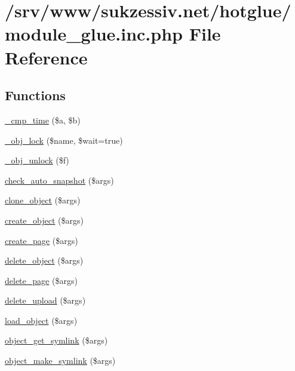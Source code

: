 \hypertarget{module__glue_8inc_8php}{
\section{/srv/www/sukzessiv.net/hotglue/module\_\-glue.inc.php File Reference}
\label{module__glue_8inc_8php}
}
\subsection*{Functions}
\begin{DoxyCompactItemize}
\item 
\hyperlink{module__glue_8inc_8php_a5fea6c120a24a298149febcbf3b1df10}{\_\-cmp\_\-time} (\$a, \$b)
\item 
\hyperlink{module__glue_8inc_8php_a21f260355b875069ca90edf1f9a559d0}{\_\-obj\_\-lock} (\$name, \$wait=true)
\item 
\hyperlink{module__glue_8inc_8php_a73a91facde5362e20df9657d31c2bb06}{\_\-obj\_\-unlock} (\$f)
\item 
\hyperlink{module__glue_8inc_8php_aaa1103a091b9dbca790e77d25a452ca5}{check\_\-auto\_\-snapshot} (\$args)
\item 
\hyperlink{module__glue_8inc_8php_a9c7f39d87787ce288ce3d8a3e389ba95}{clone\_\-object} (\$args)
\item 
\hyperlink{module__glue_8inc_8php_a12aa18f28f86274d770ba90aa88e2c3e}{create\_\-object} (\$args)
\item 
\hyperlink{module__glue_8inc_8php_a9806cd2a9b829a24876b149753e819fb}{create\_\-page} (\$args)
\item 
\hyperlink{module__glue_8inc_8php_a51fdb1d1ff829d6d2d79a9f852b7e0ef}{delete\_\-object} (\$args)
\item 
\hyperlink{module__glue_8inc_8php_af11541a6869804225793b82e54fa09fe}{delete\_\-page} (\$args)
\item 
\hyperlink{module__glue_8inc_8php_aa4865d52ac449f8aaadb3a5d425f2efb}{delete\_\-upload} (\$args)
\item 
\hyperlink{module__glue_8inc_8php_ac6b5ed5ff055ccb4d07ad17cf78d5a11}{load\_\-object} (\$args)
\item 
\hyperlink{module__glue_8inc_8php_aa9618d306b7ee5bd9e5d6a0be268ed44}{object\_\-get\_\-symlink} (\$args)
\item 
\hyperlink{module__glue_8inc_8php_a14e6da411df5aa9ff38e2d4ea27dd077}{object\_\-make\_\-symlink} (\$args)
\item 

\end{DoxyCompactItemize}
